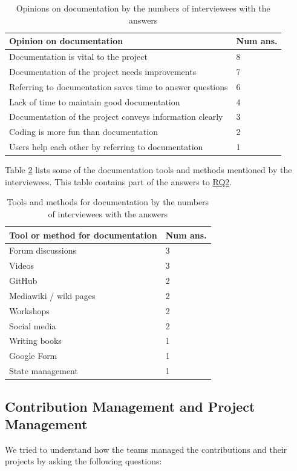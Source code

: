 \documentclass[3p, 12pt,authoryear]{elsarticle}
\begin{document}
\begin{table}[ht]
\centering
\begin{tabular}{ll}
\hline
Opinion on documentation & Num ans. \\ \hline
Documentation is vital to the project& 8 \\
Documentation of the project needs improvements & 7 \\
Referring to documentation saves time to answer questions & 6 \\
Lack of time to maintain good documentation & 4 \\
Documentation of the project conveys information clearly & 3 \\
Coding is more fun than documentation & 2 \\
Users help each other by referring to documentation & 1 \\ \hline
\end{tabular}
\caption{\label{tab_opinion_doc}Opinions on documentation by the numbers of
interviewees with the answers}
\end{table}

Table \ref{tab_doc_tools} lists some of the documentation tools and methods
mentioned by the interviewees. This table contains part of the answers to
\hyperlink{rq2}{RQ2}.

\begin{table}[ht]
\centering
\begin{tabular}{ll}
\hline
Tool or method for documentation & Num ans. \\ \hline
Forum discussions & 3 \\
Videos & 3 \\
GitHub & 2 \\
Mediawiki / wiki pages & 2 \\
Workshops & 2 \\
Social media & 2 \\
Writing books & 1 \\
Google Form & 1 \\
State management & 1 \\ \hline
\end{tabular}
\caption{\label{tab_doc_tools}Tools and methods for documentation by the numbers
of interviewees with the answers}
\end{table}

\subsection{Contribution Management and Project Management}
\label{sec_contribution_pm}
We tried to understand how the teams managed the contributions and their
projects by asking the following questions:
\end{document}

